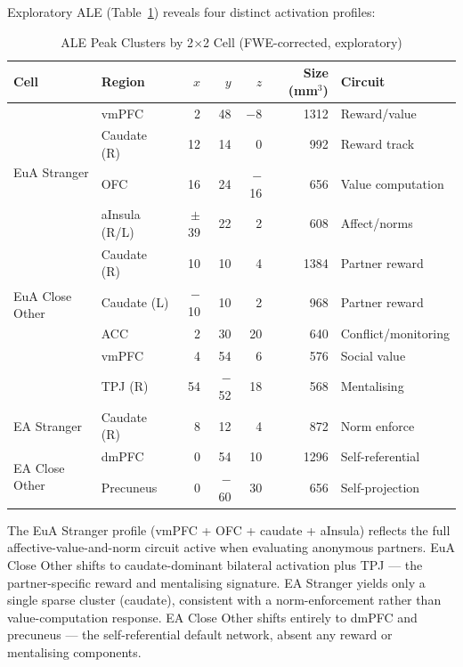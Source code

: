 \documentclass[11pt,a4paper]{article}
\begin{document}
Exploratory ALE (Table~\ref{tab:ale_2x2}) reveals four distinct activation profiles:

\begin{table}[ht]
\centering\small
\caption{ALE Peak Clusters by 2$\times$2 Cell (FWE-corrected, exploratory)}
\label{tab:ale_2x2}
\renewcommand{\arraystretch}{1.25}
\begin{tabular}{llrrrrl}
\toprule
\textbf{Cell} & \textbf{Region} & $x$ & $y$ & $z$ & \textbf{Size (mm$^3$)} & \textbf{Circuit} \\
\midrule
\multirow{4}{*}{\textcolor{euaBlue}{EuA Stranger}} & vmPFC  &  2 &  48 & $-$8 & 1312 & Reward/value \\
 & Caudate (R) & 12 & 14 &   0 &  992 & Reward track \\
 & OFC         & 16 & 24 & $-$16 & 656 & Value computation \\
 & aInsula (R/L) & $\pm$39 & 22 &  2 & 608 & Affect/norms \\
\midrule
\multirow{4}{*}{\textcolor{euaBlue}{EuA Close Other}} & Caudate (R) & 10 & 10 &  4 & 1384 & Partner reward \\
 & Caudate (L)  & $-$10 & 10 &  2 & 968 & Partner reward \\
 & ACC          &  2 & 30 & 20 &  640 & Conflict/monitoring \\
 & vmPFC        &  4 & 54 &  6 &  576 & Social value \\
 & TPJ (R)      & 54 & $-$52 & 18 & 568 & Mentalising \\
\midrule
\textcolor{eaRed}{EA Stranger}    & Caudate (R) &  8 & 12 &  4 &  872 & Norm enforce \\
\midrule
\multirow{2}{*}{\textcolor{eaRed}{EA Close Other}} & dmPFC    &  0 & 54 & 10 & 1296 & Self-referential \\
 & Precuneus & 0 & $-$60 & 30 & 656 & Self-projection \\
\bottomrule
\end{tabular}
\end{table}

\noindent The EuA Stranger profile (vmPFC + OFC + caudate + aInsula) reflects the full
affective-value-and-norm circuit active when evaluating anonymous partners. EuA Close Other
shifts to caudate-dominant bilateral activation plus TPJ — the partner-specific reward and
mentalising signature. EA Stranger yields only a single sparse cluster (caudate), consistent
with a norm-enforcement rather than value-computation response. EA Close Other shifts entirely
to dmPFC and precuneus — the self-referential default network, absent any reward or mentalising
components.
\end{document}
